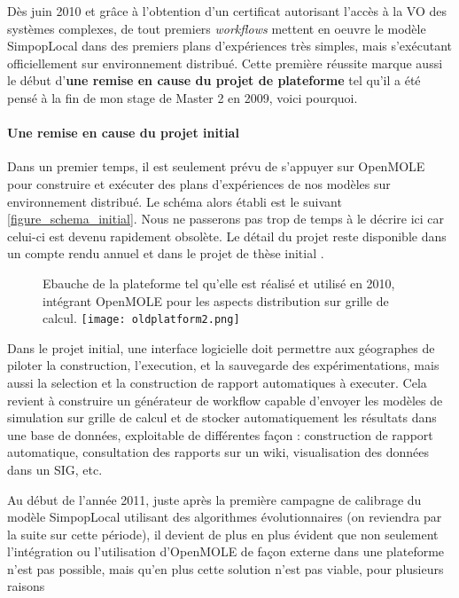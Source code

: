 
Dès juin 2010 et grâce à l'obtention d'un certificat autorisant l'accès à la VO des systèmes complexes, de tout premiers \textit{workflows} mettent en oeuvre le modèle SimpopLocal dans des premiers plans d'expériences très simples, mais s'exécutant officiellement sur environnement distribué. Cette première réussite marque aussi le début d'\textbf{une remise en cause du projet de plateforme} tel qu'il a été pensé à la fin de mon stage de Master 2 en 2009, voici pourquoi.

\paragraph {Une remise en cause du projet initial}

Dans un premier temps, il est seulement prévu de s'appuyer sur OpenMOLE pour construire et exécuter des plans d'expériences de nos modèles sur environnement distribué. Le schéma alors établi est le suivant \ref{figure_schema_initial}. Nous ne passerons pas trop de temps à le décrire ici car celui-ci est devenu rapidement obsolète. Le détail du projet reste disponible dans un compte rendu annuel et dans le projet de thèse initial \autocites{Rey2010, Rey2009}.

\begin{figure}[!htbp]
	\begin{sidecaption}[fortoc]{Ebauche de la plateforme tel qu'elle est réalisé et utilisé en 2010, intégrant OpenMOLE pour les aspects distribution sur grille de calcul.}
	 \centering
	 	\texttt{[image: oldplatform2.png]}
 \end{sidecaption}
\end{figure}

Dans le projet initial, une interface logicielle doit permettre aux géographes de piloter la construction, l'execution, et la sauvegarde des expérimentations, mais aussi la selection et la construction de rapport automatiques à executer. Cela revient à construire un générateur de workflow capable d'envoyer les modèles de simulation sur grille de calcul et de stocker automatiquement les résultats dans une base de données, exploitable de différentes façon : construction de rapport automatique, consultation des rapports sur un wiki, visualisation des données dans un SIG, etc.

Au début de l'année 2011, juste après la première campagne de calibrage du modèle SimpopLocal utilisant des algorithmes évolutionnaires (on reviendra par la suite sur cette période), il devient de plus en plus évident que non seulement l'intégration ou l'utilisation d'OpenMOLE de façon externe dans une plateforme n'est pas possible, mais qu'en plus cette solution n'est pas viable, pour plusieurs raisons

